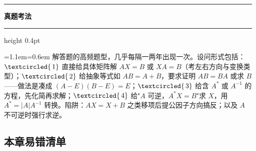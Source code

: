 \documentclass[11pt,openany,UTF8]{ctexbook}
\newcommand{\circled}[1]{\textcircled{\scriptsize\,#1}}
\newcommand{\callouthead}[2]{%
  \par\addvspace{7pt}\noindent
  {\color{#1}\rule[-0.15em]{3pt}{1.05em}}\hspace{0.5em}%
  {\bfseries\color{#1}#2}\par\nobreak\vspace{-0.35em}%
  {\color{rulesep}\hrule height 0.4pt}\nobreak\vspace{0.45em}%
  \begingroup\small\setlength{\parindent}{0pt}%
  \leftskip=1.1em\rightskip=0.6em\noindent\ignorespaces}
\newcommand{\calloutend}{\par\endgroup\addvspace{7pt}}
\newenvironment{callexam}[1]{\callouthead{exambar}{#1}}{\calloutend}
\begin{document}
\begin{callexam}{真题考法}
解答题的高频题型，几乎每隔一两年出现一次。设问形式包括：$\circled{1}$ 直接给具体矩阵解 $AX=B$ 或 $XA=B$（考左右方向与变换类型）；$\circled{2}$ 给抽象等式如 $AB=A+B$，要求证明 $AB=BA$ 或求 $B$——做法是凑成 $(A-E)(B-E)=E$；$\circled{3}$ 给含 $A^*$ 或 $A^{-1}$ 的方程，先化简再求解；$\circled{4}$ 给"$A$ 可逆，$A^*X=B$"求 $X$，用 $A^*=\vert A\vert A^{-1}$ 转换。陷阱：$AX=X+B$ 之类移项后提公因子方向搞反；以及 $A$ 不可逆时强行求逆。

\end{callexam}

\subsection*{本章易错清单}
\end{document}
